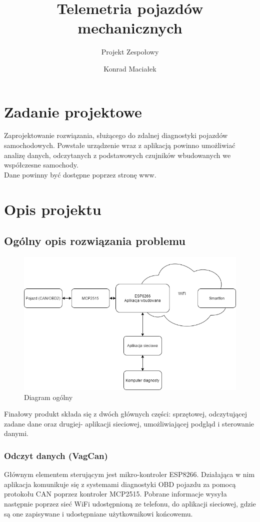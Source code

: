 \documentclass[10pt,a4paper]{scrartcl}
\author{Konrad Maciałek}
\title{Telemetria pojazdów mechanicznych}
\subtitle{Projekt Zespołowy}
\begin{document}
	\maketitle
	\newpage
	\section{Zadanie projektowe}
	Zaprojektowanie rozwiązania, służącego do zdalnej diagnostyki pojazdów samochodowych. Powstałe urządzenie wraz z aplikacją powinno umożliwiać analizę danych, odczytanych z podstawowych czujników wbudowanych we współczesne samochody.
	\\
	Dane powinny być dostępne poprzez stronę www.
	\section{Opis projektu}
		\subsection{Ogólny opis rozwiązania problemu}
		\begin{figure}[H]
			\centering
			\includegraphics[width=0.7\linewidth]{./remoteCarDiagz.drawio}
			\caption[Diagram ogólny]{Diagram ogólny}
			\label{fig:remotecardiagz}
		\end{figure}
		Finałowy produkt składa się z dwóch głównych części: sprzętowej, odczytującej zadane dane oraz drugiej- aplikacji sieciowej, umożliwiającej podgląd i sterowanie danymi. 
		\subsubsection{Odczyt danych (VagCan)}
		Głównym elementem sterującym jest mikro-kontroler ESP8266. Działająca w nim aplikacja komunikuje się z systemami diagnostyki OBD pojazdu za pomocą protokołu CAN poprzez kontroler MCP2515. Pobrane informacje wysyła następnie poprzez sieć WiFi udostępnioną ze telefonu, do aplikacji sieciowej, gdzie są one zapisywane i udostępniane użytkownikowi końcowemu. 
\end{document}
